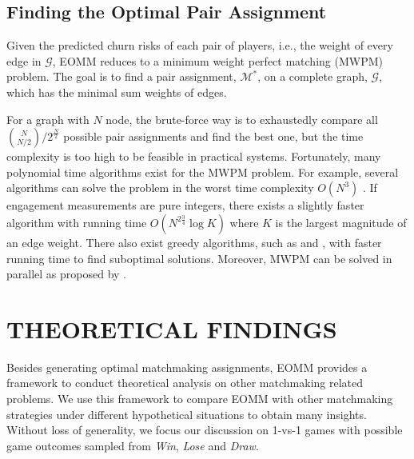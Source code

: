 \vspace{2mm}

\subsection{Finding the Optimal Pair Assignment}
Given the predicted churn risks of each pair of players, i.e., the weight of every edge in $\mathcal{G}$, EOMM reduces to a minimum weight perfect matching (MWPM) problem. The goal is to find a pair assignment, $\mathcal{M}^*$, on a complete graph, $\mathcal{G}$, which has the minimal sum weights of edges.

For a graph with $N$ node, the brute-force way is to exhaustedly compare all $\binom N{N/2} / 2^{\frac{N}{2}}$ possible pair assignments and find the best one, but the time complexity is too high to be feasible in practical systems. Fortunately, many polynomial time algorithms exist for the MWPM problem. For example, several algorithms can solve the problem in the worst time complexity $O(N^3)$ \cite{gabow1974implementation,lawler2001combinatorial}. If engagement measurements are pure integers, there exists a slightly faster algorithm \cite{gabow1985scaling} with running time $O(N^{2\frac{3}{4}}\log K)$ where $K$ is the largest magnitude of an edge weight. There also exist greedy algorithms, such as \cite{drake2003simple} and \cite{duan2014linear}, with faster running time to find suboptimal solutions. Moreover, MWPM can be solved in parallel as proposed by \cite{osiakwan1990maximum}.

\vspace{3mm}

\section{THEORETICAL FINDINGS}\label{sec:findings}
Besides generating optimal matchmaking assignments, EOMM provides a framework to conduct theoretical analysis on other matchmaking related problems. We use this framework to compare EOMM with other matchmaking strategies under different hypothetical situations to obtain many insights. Without loss of generality, we focus our discussion on 1-vs-1 games with possible game outcomes sampled from \emph{Win}, \emph{Lose} and \emph{Draw}.

